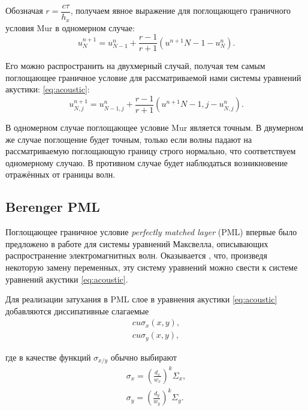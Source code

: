\noindent Обозначая $r = \dfrac{c \tau}{h_x}$, получаем явное выражение для поглощающего граничного условия Mur в одномерном случае:
\begin{equation*}
    u^{n+1}_N = u^n_{N-1} + \dfrac{r-1}{r+1}(u^{n+1}{N-1}-u^n_N).
\end{equation*}

Его можно распространить на двухмерный случай, получая тем самым поглощающее граничное условие для рассматриваемой нами системы уравнений акустики: \eqref{eq:acoustic}:
\begin{equation*}
    u^{n+1}_{N,j} = u^n_{N-1,j} + \dfrac{r-1}{r+1}(u^{n+1}{N-1,j}-u^n_{N,j}) .
\end{equation*}

В одномерном случае поглощающее условие Mur является точным. В двумерном же случае поглощение будет точным, только если волны падают на рассматриваемую поглощающую границу строго нормально, что соответствуем одномерному случаю. В противном случае будет наблюдаться возникновение отражённых от границы волн.

\subsection{Berenger PML}

Поглощающее граничное условие \textit{perfectly matched layer} (PML) впервые было предложено в работе \cite{berenger} для системы уравнений Максвелла, описывающих распространение электромагнитных волн. Оказывается \cite{pml_from_maxwell}, что, произведя некоторую замену переменных, эту систему уравнений можно свести к системе уравнений акустики \eqref{eq:acoustic}.

Для реализации затухания в PML слое в уравнения акустики \eqref{eq:acoustic} добавляются диссипативные слагаемые
\begin{equation*}
\begin{gathered}
    c u \sigma_x(x,y) , \\
    c u \sigma_y(x,y) ,
\end{gathered}
\end{equation*}

\noindent где в качестве функций $\sigma_{x/y}$ обычно выбирают
\begin{equation}
\begin{gathered}
	\sigma_x = \left(\frac{d_x}{w_{x}}\right)^k \Sigma_{x} ,\\
	\sigma_y = \left(\frac{d_y}{w_{y}}\right)^k \Sigma_{y} .
\end{gathered}
\label{eq:pml_coefs}
\end{equation}

